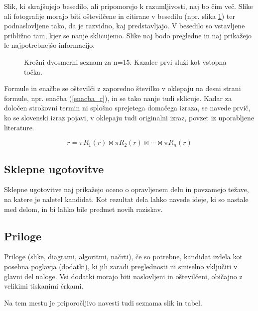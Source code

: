 \documentclass[12pt,a4paper]{book}
\begin{document}
Slik, ki skrajšujejo besedilo, ali pripomorejo k razumljivosti, naj bo čim več. Slike ali fotografije morajo biti
oštevilčene in citirane v besedilu (npr. slika \ref{slika_seznam}) ter podnaslovljene tako, da je razvidno, kaj predstavljajo. V besedilo so
vstavljene približno tam, kjer se nanje sklicujemo. Slike naj bodo pregledne in naj prikažejo le najpotrebnejšo informacijo. 

\begin{figure}[htb]
\centerline{}
\caption[Krožni dvosmerni seznam.]{Krožni dvosmerni seznam za n=15. Kazalec prvi služi kot vstopna to\v cka.}
\label{slika_seznam}
\end{figure}

Formule in enačbe se oštevilči z zaporedno številko v oklepaju na desni strani formule, npr. enačba (\ref{enacba_r}), 
in se tako nanje tudi sklicuje. Kadar za določen strokovni termin ni splošno sprejetega domačega izraza, se navede prvič, ko se slovenski izraz
pojavi, v oklepaju tudi originalni izraz, povzet iz uporabljene literature.

\begin{equation}
r = \pi R_1 (r) \bowtie \pi R_2 (r) \bowtie \cdots \bowtie  \pi R_n  (r)
\label{enacba_r}
\end{equation}

\subsection{Sklepne ugotovitve}

Sklepne ugotovitve naj prikažejo oceno o opravljenem delu in povzamejo težave, na katere je naletel kandidat. Kot rezultat dela
lahko navede ideje, ki so nastale med delom, in bi lahko bile predmet novih raziskav.

\subsection{Priloge}
Priloge (slike, diagrami, algoritmi, načrti), 
če so potrebne, kandidat izdela kot posebna poglavja (dodatki), ki jih zaradi preglednosti ni smiselno vključiti v glavni del naloge. Vsi
dodatki morajo biti naslovljeni in oštevilčeni, običajno z velikimi tiskanimi črkami. 

Na tem mestu je priporočljivo navesti tudi seznama slik in tabel.
\end{document}
